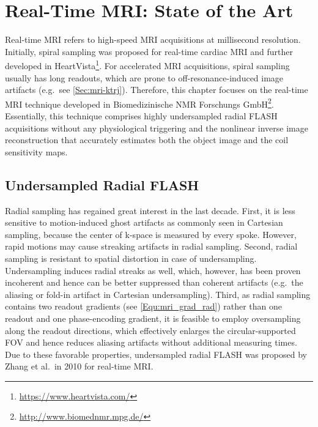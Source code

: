 \chapter{Real-Time MRI: State of the Art} \label{Chp:rtMRI}

Real-time MRI refers to high-speed MRI acquisitions at millisecond resolution. Initially, spiral sampling was proposed for real-time cardiac MRI \cite{2004_rt_spiral} and further developed in HeartVista\texttrademark\footnote{\url{https://www.heartvista.com/}}. For accelerated MRI acquisitions, spiral sampling usually has long readouts, which are prone to off-resonance-induced image artifacts (e.g.~see \cref{Sec:mri-ktrj}). Therefore, this chapter focuses on the real-time \acs{MRI} technique developed in Biomedizinische NMR Forschungs GmbH\footnote{\url{http://www.biomednmr.mpg.de/}}. Essentially, this technique comprises highly undersampled radial \acs{FLASH} acquisitions without any physiological triggering and the nonlinear inverse image reconstruction that accurately estimates both the object image and the coil sensitivity maps. 


\section{Undersampled Radial FLASH} \label{Sec:rtmri-rfl}
Radial sampling has regained great interest in the last decade. First, it is less sensitive to motion-induced ghost artifacts as commonly seen in Cartesian sampling, because the center of k-space is measured by every spoke. However, rapid motions may cause streaking artifacts in radial sampling. Second, radial sampling is resistant to spatial distortion in case of undersampling. Undersampling induces radial streaks as well, which, however, has been proven incoherent and hence can be better suppressed than coherent artifacts (e.g.~the aliasing or fold-in artifact in Cartesian undersampling). Third, as radial sampling contains two readout gradients (see \cref{Equ:mri_grad_rad}) rather than one readout and one phase-encoding gradient, it is feasible to employ oversampling along the readout directions, which effectively enlarges the circular-supported \acs{FOV} and hence reduces aliasing artifacts without additional measuring times. Due to these favorable properties, undersampled radial FLASH was proposed by Zhang et al.~in 2010 \cite{2010_rfl_JMRI} for real-time MRI.

